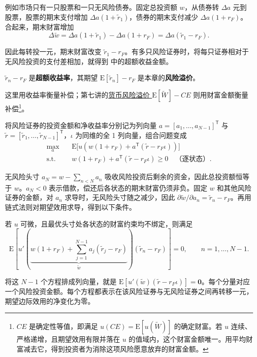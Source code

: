 例如市场只有一只股票和一只无风险债券。固定总投资额 $w$，从债券转 $\Delta a$ 元到股票，股票的期末支付增加 $\Delta a(1+\tilde r_1)$，债券的期末支付减少 $\Delta a(1+r_F)$。合起来，期末财富增加
\[
 \Delta\tilde w
 =\Delta a(1+\tilde r_1)-\Delta a(1+r_F)
 =\Delta a(\tilde r_1-r_F).
\]

因此每转投一元，期末财富改变 $\tilde r_1-r_F$。有多只风险证券时，将每只证券相对于无风险投资的支付差相加，就得到 中的超额收益金额。

\begin{tcolorbox}[knowledge,title=超额收益率与风险溢价]
$\tilde r_n-r_F$ 是\textbf{超额收益率}，其期望 $\mathrm E[\tilde r_n]-r_F$ 是本章的\textbf{风险溢价}。
\end{tcolorbox}

这里用收益率衡量补偿；第七讲的\hyperlink{wj-certainty-equivalent-risk-premium}{\textcolor{WJReferenceColor}{货币风险溢价 $\mathrm E[\widetilde W]-CE$}} 则用财富金额衡量补偿\footnote{$CE$ 是确定性等值，即满足 $u(CE)=\mathrm E[u(\widetilde W)]$ 的确定财富。若 $u$ 连续、严格递增，且期望效用有限并落在 $u$ 的值域内，这个财富金额唯一。用平均财富减去它，得到投资者为消除这项风险愿意放弃的财富金额。}。

将风险证券的投资金额和净收益率分别记为列向量 $a=[a_1,\ldots,a_{N-1}]^{\mathsf T}$ 与 $\tilde r=[\tilde r_1,\ldots,\tilde r_{N-1}]^{\mathsf T}$，$\iota$ 为同维的全 1 列向量，组合问题变成
\begin{equation}
 \begin{aligned}
 \max_a\quad &\mathrm E\bigl[u(w(1+r_F)+a^{\mathsf T}(\tilde r-r_F\iota))\bigr]\\
 \text{s.t.}\quad &w(1+r_F)+a^{\mathsf T}(\tilde r-r_F\iota)\ge0
 \quad\text{（逐状态）}.
\end{aligned}\label{eq:wj-8-12}
\end{equation}

无风险头寸 $a_N=w-\sum_{n<N}a_n$ 吸收风险投资后剩余的资金，因此总投资额恒等于 $w$。$a_N<0$ 表示借款，偿还后各状态的期末财富仍须非负。固定 $w$ 和其他风险证券的金额，对 $a_n$ 求导时，无风险头寸随之减少，因此 $\partial\tilde w/\partial a_n=\tilde r_n-r_F$。再用链式法则对期望效用求导，得到以下条件。

\begin{tcolorbox}[knowledge,title=风险证券投资金额的最优条件]
若 $u$ 可微，且最优头寸处各状态的财富约束均不绑定，则满足
\begin{equation}
 \mathrm E\!\left[u'\!\left(
 \underbrace{w(1+r_F)+\sum_{j=1}^{N-1}a_j(\tilde r_j-r_F)}_{\tilde w}
 \right)(\tilde r_n-r_F)\right]=0,
 \qquad n=1,\ldots,N-1.\label{eq:wj-8-13}
\end{equation}

将这 $N-1$ 个方程排成列向量，就是 $\mathrm E[u'(\tilde w)(\tilde r-r_F\iota)]=\mathbf 0$。每个分量对应一个风险投资金额。每个方程都表示在该风险证券与无风险证券之间再转移一元，期望边际效用的净变化为零。
\end{tcolorbox}

